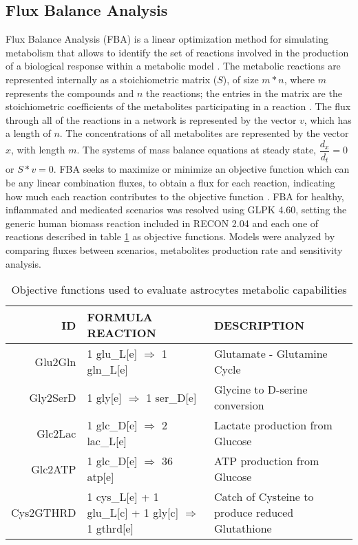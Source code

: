 \subsection{Flux Balance Analysis}
Flux Balance Analysis (FBA) is a linear optimization method for simulating metabolism that allows to identify the set of reactions involved in the production of a biological response within a metabolic model \cite{Orth2010}. The metabolic reactions are represented internally as a stoichiometric matrix ($S$), of size $m * n$, where $m$ represents the compounds and $n$ the reactions; the entries in the matrix are the stoichiometric coefficients of the metabolites participating in a reaction \cite{Raman2009}. The flux through all of the reactions in a network is represented by the vector $v$, which has a length of $n$. The concentrations of all metabolites are represented by the vector $x$, with length $m$. The systems of mass balance equations at steady state, $\dfrac{d_{x}}{d_{t}}=0$ or $S * v = 0$. FBA seeks to maximize or minimize an objective function which can be any linear combination fluxes, to obtain a flux for each reaction, indicating how much each reaction contributes to the objective function \cite{Orth2010}. FBA for healthy, inflammated and medicated scenarios was resolved using GLPK 4.60, setting the generic human biomass reaction included in RECON 2.04 and each one of reactions described in table \ref{OF} as objective functions. Models were analyzed by comparing fluxes between scenarios, metabolites production rate and sensitivity analysis.

\begin{table}[h]
\caption{Objective functions used to evaluate astrocytes metabolic capabilities \cite{Allaman2011}}
\label{OF}
\begin{center}
\begin{tabular}{rm{6.5cm}m{6cm}}
\hline
ID & FORMULA REACTION & DESCRIPTION \\
\hline
\hline
Glu2Gln & 1 glu\_L[e] $\Rightarrow$ 1 gln\_L[e] & Glutamate - Glutamine Cycle \\
Gly2SerD & 1 gly[e] $\Rightarrow$ 1 ser\_D[e] & Glycine to D-serine conversion\\
Glc2Lac & 1 glc\_D[e] $\Rightarrow$ 2 lac\_L[e]& Lactate production from Glucose \\
Glc2ATP & 1 glc\_D[e] $\Rightarrow$ 36 atp[e] & ATP production from Glucose \\
Cys2GTHRD&1 cys\_L[e] + 1 glu\_L[c] + 1 gly[c] $\Rightarrow$ 1 gthrd[e]& Catch of Cysteine to produce reduced Glutathione \\
\hline
\end{tabular}
\end{center}
\end{table} 
\vspace*{-1cm}
